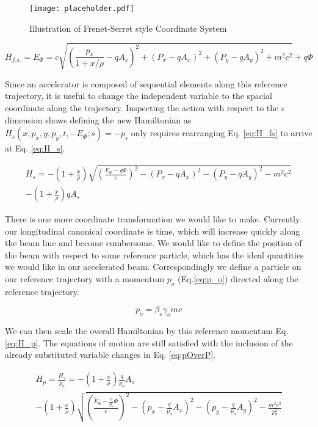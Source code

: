 \begin{figure} \label{fig:frenetSerret}
	\centering
	\texttt{[image: placeholder.pdf]}
	\caption{Illustration of Frenet-Serret style Coordinate System}
\end{figure}

\begin{equation} \label{eq:H_fs}
	H_{f.s.} = E_{\Phi} = c\sqrt{\left(\frac{p_s}{1 + x/\rho} - qA_s\right)^2 + (P_x - qA_x)^2 + (P_y- qA_y)^2+ m^2c^2} + q\Phi
\end{equation}

Since an accelerator is composed of sequential elements along this reference trajectory, it is useful to change the independent variable to the spacial coordinate along the trajectory. Inspecting the action with respect to the s dimension shows defining the new Hamiltonian as $H_s(x,p_x,y,p_y,t,-E_{\Phi};s) = -p_s$ only requires rearranging Eq. \ref{eq:H_fs} to arrive at Eq. \ref{eq:H_s}.

\begin{multline} \label{eq:H_s}
	H_s = -\left(1 + \frac{x}{\rho}\right)\sqrt{\left(\frac{E_{\Phi} - q\Phi}{c}\right)^2 - (P_x -q A_x)^2 - (P_y - q A_y)^2 - m^2c^2}\\ - \left(1 + \frac{x}{\rho}\right)qA_s
\end{multline}

There is one more coordinate transformation we would like to make. Currently our longitudinal canonical coordinate is time, which will increase quickly along the beam line and become cumbersome. We would like to define the position of the beam with respect to some reference particle, which has the ideal quantities we would like in our accelerated beam. Correspondingly we define a particle on our reference trajectory with a momentum $p_o$ (Eq.\ref{eq:p_o}) directed along the reference trajectory.

\begin{equation} \label{eq:p_o}
	p_o = \beta_o \gamma_o m c
\end{equation}

We can then scale the overall Hamiltonian by this reference momentum Eq. \ref{eq:H_p}. The equations of motion are still satisfied with the inclusion of the already substituted variable changes in Eq. \ref{eq:pOverP}.

\begin{multline} \label{eq:H_p}
	H_p = \frac{H_s}{p_o} = - \left(1 + \frac{x}{\rho}\right)\frac{q}{p_o}A_s\\
-\left(1 + \frac{x}{\rho}\right)\sqrt{\left(\frac{\tilde{E}_{\Phi} - \frac{q}{p_o}\Phi}{c}\right)^2 - \left(p_x -\frac{q}{p_o} A_x\right)^2 - \left(p_y - \frac{q}{p_o} A_y\right)^2 - \frac{m^2c^2}{p_o^2}}
\end{multline}



